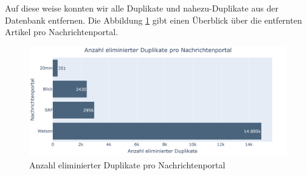 Auf diese weise konnten wir alle Duplikate und nahezu-Duplikate aus der Datenbank entfernen.
Die Abbildung \ref{duplicates} gibt einen Überblick über die entfernten Artikel pro Nachrichtenportal.

\begin{figure}[H]
	\begin{center}
        \centering
		\includegraphics[width=1\linewidth]{./images/duplicates_count.png}
		\caption{Anzahl eliminierter Duplikate pro Nachrichtenportal}
		\label{duplicates}
	\end{center}
\end{figure}